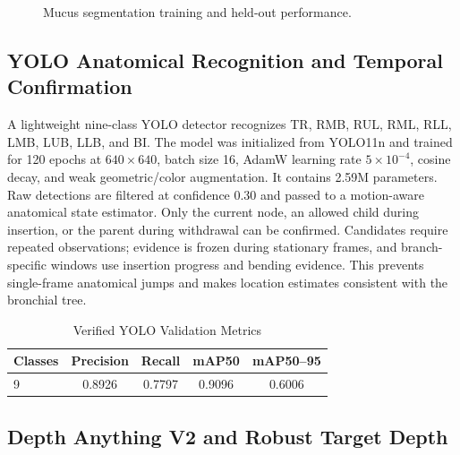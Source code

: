 \documentclass[letterpaper,10pt,conference]{ieeeconf}
\begin{document}
\begin{figure}[t]
\centering
{}
\caption{Mucus segmentation training and held-out performance.}
\label{fig:unet}
\end{figure}

\subsection{YOLO Anatomical Recognition and Temporal Confirmation}

A lightweight nine-class YOLO detector recognizes TR, RMB, RUL, RML, RLL, LMB,
LUB, LLB, and BI. The model was initialized from YOLO11n and trained for 120
epochs at $640\!\times\!640$, batch size 16, AdamW learning rate $5\times10^{-4}$,
cosine decay, and weak geometric/color augmentation. It contains 2.59M
parameters. Raw detections are filtered at confidence 0.30 and passed to a
motion-aware anatomical state estimator. Only the current node, an allowed
child during insertion, or the parent during withdrawal can be confirmed.
Candidates require repeated observations; evidence is frozen during stationary
frames, and branch-specific windows use insertion progress and bending evidence.
This prevents single-frame anatomical jumps and makes location estimates
consistent with the bronchial tree.

\begin{table}[t]
\caption{Verified YOLO Validation Metrics}
\label{tab:yolo}
\centering\small
\begin{tabular}{lcccc}
\toprule
Classes & Precision & Recall & mAP50 & mAP50--95 \\
\midrule
9 & 0.8926 & 0.7797 & 0.9096 & 0.6006 \\
\bottomrule
\end{tabular}
\end{table}

\subsection{Depth Anything V2 and Robust Target Depth}
\end{document}
